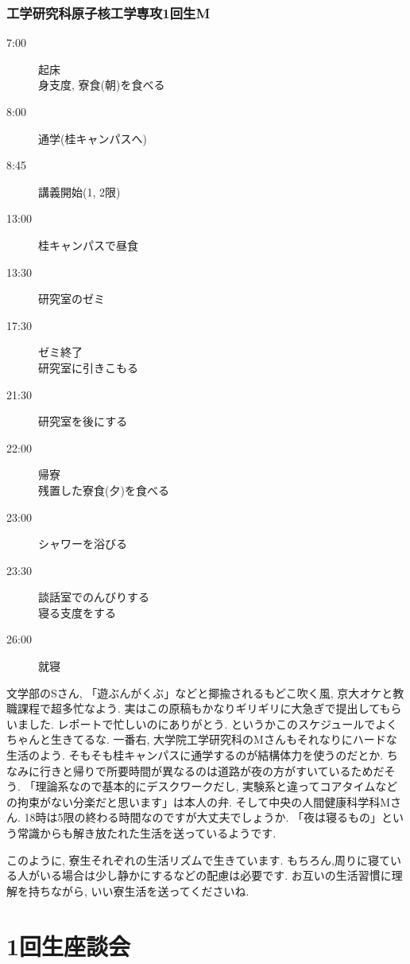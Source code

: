\documentclass[10pt,b5jsbook,dvips,dvipdfmx,openany]{jsbook}
\theoremstyle{definition}
\begin{document}
			\subsubsection{工学研究科原子核工学専攻1回生M}

			\begin{description}
			\item[ 7:00] 起床 \\ 身支度, 寮食(朝)を食べる
			\item[ 8:00] 通学(桂キャンパスへ)
			\item[ 8:45] 講義開始(1, 2限)
			\item[13:00] 桂キャンパスで昼食
			\item[13:30] 研究室のゼミ
			\item[17:30] ゼミ終了 \\ 研究室に引きこもる
			\item[21:30] 研究室を後にする
			\item[22:00] 帰寮\\ 残置した寮食(夕)を食べる
			\item[23:00] シャワーを浴びる
			\item[23:30] 談話室でのんびりする \\ 寝る支度をする
			\item[26:00] 就寝
			\end{description}

			文学部のSさん, 「遊ぶんがくぶ」などと揶揄されるもどこ吹く風, 京大オケと教職課程で超多忙なよう. 実はこの原稿もかなりギリギリに大急ぎで提出してもらいました. レポートで忙しいのにありがとう. というかこのスケジュールでよくちゃんと生きてるな. 一番右, 大学院工学研究科のMさんもそれなりにハードな生活のよう. そもそも桂キャンパスに通学するのが結構体力を使うのだとか. ちなみに行きと帰りで所要時間が異なるのは道路が夜の方がすいているためだそう. 「理論系なので基本的にデスクワークだし, 実験系と違ってコアタイムなどの拘束がない分楽だと思います」は本人の弁. そして中央の人間健康科学科Mさん. 18時は5限の終わる時間なのですが大丈夫でしょうか. 「夜は寝るもの」という常識からも解き放たれた生活を送っているようです.

			このように, 寮生それぞれの生活リズムで生きています. もちろん,周りに寝ている人がいる場合は少し静かにするなどの配慮は必要です. お互いの生活習慣に理解を持ちながら, いい寮生活を送ってくださいね.

\newpage
		\section{1回生座談会}
\end{document}
